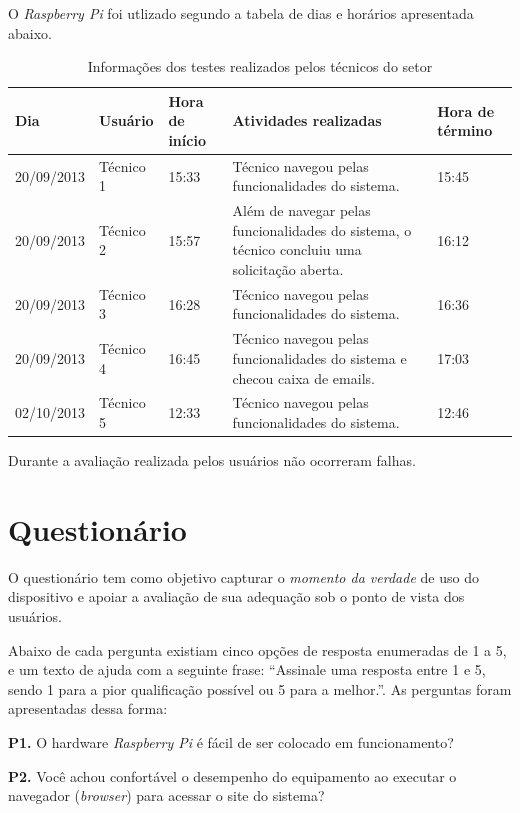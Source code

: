 O \textit{Raspberry Pi} foi utlizado segundo a tabela de dias e horários apresentada abaixo.

\begin{table}[!htpb]
 \centering
    \begin{tabular}{|p{2cm}|p{2cm}|p{2cm}|p{5cm}|p{2cm}|} 
    \hline
        \textbf{Dia} & \textbf{Usuário} & \textbf{Hora de início} & \textbf{Atividades realizadas} &  \textbf{Hora de término} \\
    \hline
         20/09/2013 & Técnico 1 & 15:33 & Técnico navegou pelas funcionalidades do sistema. & 15:45 \\
    \hline
        20/09/2013 & Técnico 2 & 15:57 & Além de navegar pelas funcionalidades do sistema, o técnico concluiu uma solicitação aberta. & 16:12 \\
    \hline
        20/09/2013 & Técnico 3 & 16:28 & Técnico navegou pelas funcionalidades do sistema. & 16:36 \\
    \hline
        20/09/2013 & Técnico 4 & 16:45 & Técnico navegou pelas funcionalidades do sistema e checou caixa de emails. & 17:03 \\
    \hline
        02/10/2013 & Técnico 5 & 12:33 & Técnico navegou pelas funcionalidades do sistema. & 12:46 \\
    \hline
    \end{tabular}
    \caption{Informações dos testes realizados pelos técnicos do setor}
    \label{t_fixa}
\end{table}

Durante a avaliação realizada pelos usuários não ocorreram falhas.

\section{Questionário}

O questionário tem como objetivo capturar o \textit{momento da verdade} de uso do dispositivo e apoiar a avaliação de sua adequação sob o ponto de vista dos usuários.

Abaixo de cada pergunta existiam cinco opções de resposta enumeradas de 1 a 5, e um texto de ajuda com a seguinte frase: “Assinale uma resposta entre 1 e 5, sendo 1 para a pior qualificação possível ou 5 para a melhor.”.
As perguntas foram apresentadas dessa forma:

\textbf{P1.} O hardware \textit{Raspberry Pi} é fácil de ser colocado em funcionamento?

\textbf{P2.} Você achou confortável o desempenho do equipamento ao executar o navegador (\textit{browser}) para acessar o site do sistema?

